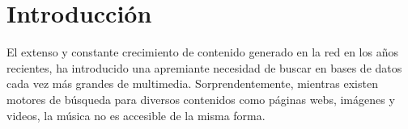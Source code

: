 \chapter*{Introducción}\label{chapter:introduction}
El extenso y constante crecimiento de contenido generado en la red en los años recientes, ha 
introducido una apremiante necesidad de buscar en bases de datos cada vez más grandes de multimedia.
Sorprendentemente, mientras existen motores de búsqueda para diversos contenidos como páginas webs, 
imágenes y videos, la música no es accesible de la misma forma.\\ %

